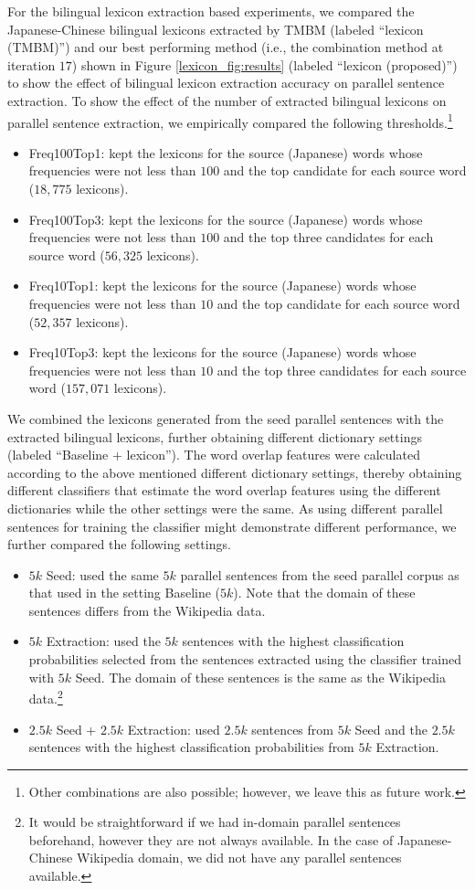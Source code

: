 \documentclass[english]{jnlp_1.4}
\begin{document}
For the bilingual lexicon extraction based experiments, we compared the Japanese-Chinese 
bilingual lexicons extracted by TMBM (labeled ``lexicon (TMBM)'') and our best performing method 
(i.e., the combination method at iteration $17$) shown in Figure \ref{lexicon_fig:results} (labeled ``lexicon (proposed)'')
to show the effect of bilingual lexicon extraction accuracy
on parallel sentence extraction. To show the effect of the number of extracted 
bilingual lexicons on parallel sentence extraction, we empirically compared the 
following thresholds.\footnote{Other combinations are also possible;
however, we leave this as future work.}
\begin{itemize}
\item Freq100Top1: kept the lexicons for the source (Japanese) words whose frequencies
were not less than $100$ and the top candidate for each source word ($18,775$ lexicons).
\item Freq100Top3: kept the lexicons for the source (Japanese) words whose frequencies were 
not less than $100$ and the top three candidates for each source word ($56,325$ lexicons).
\item Freq10Top1: kept the lexicons for the source (Japanese) words whose frequencies
were not less than $10$ and the top candidate for each source word ($52,357$ lexicons).
\item Freq10Top3: kept the lexicons for the source (Japanese) words whose frequencies
were not less than $10$ and the top three candidates for each source word ($157,071$ lexicons).
\end{itemize}
We combined the lexicons generated from the seed parallel sentences
with the extracted bilingual lexicons, further obtaining
different dictionary settings (labeled ``Baseline + lexicon'').
The word overlap features were calculated according to the above mentioned different dictionary settings, 
thereby obtaining different classifiers that estimate the word overlap features using the different dictionaries 
while the other settings were the same. As using different parallel sentences for training the classifier might 
demonstrate different performance, we further compared the following settings.
\begin{itemize} 
\item $5k$ Seed: used the same $5k$ parallel sentences from the seed parallel corpus as that used in the setting Baseline ($5k$).
Note that the domain of these sentences differs from the Wikipedia data.
\item $5k$ Extraction: used {the} $5k$ sentences {with the highest classification probabilities} 
  selected from the sentences extracted using the classifier trained
  with $5k$ Seed. The domain of these sentences is the same as the Wikipedia data.\footnote{It would be straightforward 
    if we had in-domain parallel sentences beforehand, however they are not always available. In the case of Japanese-Chinese
    Wikipedia domain, we did not have any parallel sentences available.}
\item $2.5k$ Seed + $2.5k$ Extraction: used $2.5k$ sentences from $5k$ Seed and {the} $2.5k$ sentences
  {with the highest classification probabilities} from $5k$ Extraction.
\end{itemize}
\end{document}

